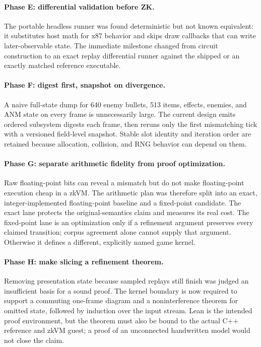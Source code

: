 \paragraph{Phase E: differential validation before ZK.}
The portable headless runner was found deterministic but not known equivalent:
it substitutes host math for x87 behavior and skips draw callbacks that can
write later-observable state.  The immediate milestone changed from circuit
construction to an exact replay differential runner against the shipped or an
exactly matched reference executable.

\paragraph{Phase F: digest first, snapshot on divergence.}
A naive full-state dump for 640 enemy bullets, 513 items, effects, enemies, and
ANM state on every frame is unnecessarily large.  The current design emits
ordered subsystem digests each frame, then reruns only the first mismatching
tick with a versioned field-level snapshot.  Stable slot identity and iteration
order are retained because allocation, collision, and RNG behavior can depend
on them.

\paragraph{Phase G: separate arithmetic fidelity from proof optimization.}
Raw floating-point bits can reveal a mismatch but do not make floating-point
execution cheap in a zkVM.  The arithmetic plan was therefore split into an
exact, integer-implemented floating-point baseline and a fixed-point candidate.
The exact lane protects the original-semantics claim and measures its real
cost.  The fixed-point lane is an optimization only if a refinement argument
preserves every claimed transition; corpus agreement alone cannot supply that
argument.  Otherwise it defines a different, explicitly named game kernel.

\paragraph{Phase H: make slicing a refinement theorem.}
Removing presentation state because sampled replays still finish was judged an
insufficient basis for a sound proof.  The kernel boundary is now required to
support a commuting one-frame diagram and a noninterference theorem for omitted
state, followed by induction over the input stream.  Lean is the intended
proof environment, but the theorem must also be bound to the actual C++
reference and zkVM guest; a proof of an unconnected handwritten model would not
close the claim.

